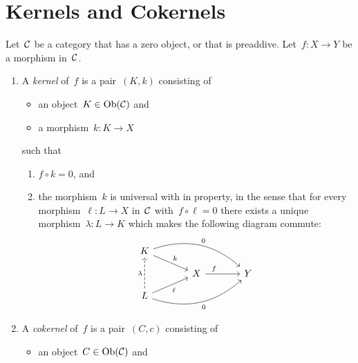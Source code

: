 \section{Kernels and Cokernels}


\begin{definition}
  Let~$\mathcal{C}$ be a category that has a zero object, or that is preaddive.
  Let~$f \colon X \to Y$ be a morphism in~$\mathcal{C}$.
  \begin{enumerate}
      \item
        A \emph{kernel} of~$f$ is a pair~$(K,k)$ consisting of
        \begin{itemize}
          \item
            an object~$K \in \operatorname{Ob}(\mathcal{C})$ and
          \item
            a morphism~$k \colon K \to X$
        \end{itemize}
        such that
        \begin{enumerate}[label = (K\arabic*)]
          \item
            $f \circ k = 0$, and
          \item
            the morphism~$k$ is universal with in property, in the sense that for every morphism~$\ell \colon L \to X$ in~$\mathcal{C}$ with~$f \circ \ell = 0$ there exists a unique morphism~$\lambda \colon L \to K$ which makes the following diagram commute:
            \[
              \begin{tikzcd}[row sep = small, column sep = large]
                  K
                  \arrow{dr}[above right]{k}
                  \arrow[bend left]{drr}[above right]{0}
                & {}
                & {}
                \\
                  {}
                & X
                  \arrow{r}[above, near start]{f}
                & Y
                \\
                  L
                  \arrow{ur}[below right]{\ell}
                  \arrow[bend right]{urr}[below right]{0}
                  \arrow[dashed]{uu}[left]{\lambda}
                & {}
                & {}
              \end{tikzcd}
            \]
        \end{enumerate}
      \item
        A \emph{cokernel} of~$f$ is a pair~$(C,c)$ consisting of
        \begin{itemize}
          \item
            an object~$C \in \operatorname{Ob}(\mathcal{C})$ and

\end{itemize}
\end{enumerate}
\end{definition}
